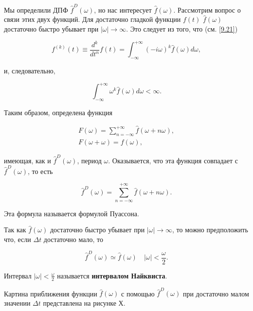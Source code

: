 Мы определили ДПФ $\hat{f}^D(\omega)$, но нас интересует $\hat{f}(\omega)$. Рассмотрим вопрос о связи этих двух функций. Для достаточно гладкой функции $f(t)$  $\hat{f}(\omega)$ достаточно быстро убывает при $|\omega| \rightarrow \infty $. Это следует из того, что (см. \ref{9.21})

\begin{equation}\label{10.16}
f^{(k)}(t) \equiv \frac{d^k}{dt^n}f(t) = \int_{-\infty}^{+\infty} (-i\omega)^k \hat{f}(\omega)d\omega,
\end{equation}

и, следовательно,

\begin{equation}\label{10.17}
\int_{-\infty}^{+\infty}\omega^k \hat{f}(\omega)d\omega < \infty.
\end{equation}

Таким образом, определена функция

\begin{equation}\label{10.18}
\begin{gathered}
F(\omega) = \sum_{n = -\infty}^{+\infty} \hat{f}(\omega+ n\omega), \\
F(\omega+\omega) = f(\omega),
\end{gathered}
\end{equation}

имеющая, как и $\hat{f}^D(\omega)$, период $\omega$. 
Оказывается, что эта функция совпадает с $\hat{f}^D(\omega)$, то есть

\begin{equation}\label{10.19}
\hat{f}^D(\omega) = \sum_{n = -\infty}^{+\infty} \hat{f}(\omega+ n\omega).
\end{equation}

Эта формула называется формулой Пуассона.

Так как $\hat{f}(\omega)$ достаточно быстро убывает при $|\omega| \rightarrow \infty $, то можно предположить что, если $\Delta t$ достаточно мало, то

\begin{equation}\label{10.20}
\hat{f}^D(\omega) \simeq \hat{f}(\omega) \quad |\omega| < \frac{\omega}{2}.
\end{equation}

Интервал $|\omega| < \frac{\omega}{2}$ называется \textbf{интервалом Найквиста}.

Картина приближения функции $\hat{f}(\omega)$ с помощью $\hat{f}^D(\omega)$ при достаточно малом значении $\Delta t$ представлена на рисунке Х.

